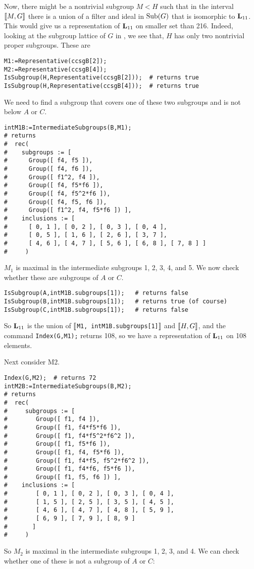 Now, there might be a nontrivial subgroup $M < H$ such that in the interval
$\llbracket M, G \rrbracket$ there is a union of a filter and ideal in $\operatorname{Sub}(G)$ that is isomorphic to
$\mathbf{L}_{11}$. This would give us a representation of $\mathbf{L}_{11}$ on smaller set than 216.
Indeed, looking at the subgroup lattice of $G$ in \xgap, we see that, 
$H$ has only two nontrivial proper subgroups.  These are

{\small 
\begin{verbatim}
M1:=Representative(ccsgB[2]);
M2:=Representative(ccsgB[4]);
IsSubgroup(H,Representative(ccsgB[2]));  # returns true
IsSubgroup(H,Representative(ccsgB[4]));  # returns true
\end{verbatim}
}
We need to find a subgroup that covers one of these two subgroups
and is not below $A$ or $C$.
{\small 
\begin{verbatim}
intM1B:=IntermediateSubgroups(B,M1);
# returns 
#  rec( 
#    subgroups := [ 
#      Group([ f4, f5 ]), 
#      Group([ f4, f6 ]), 
#      Group([ f1^2, f4 ]), 
#      Group([ f4, f5*f6 ]), 
#      Group([ f4, f5^2*f6 ]), 
#      Group([ f4, f5, f6 ]), 
#      Group([ f1^2, f4, f5*f6 ]) ], 
#    inclusions := [ 
#      [ 0, 1 ], [ 0, 2 ], [ 0, 3 ], [ 0, 4 ], 
#      [ 0, 5 ], [ 1, 6 ], [ 2, 6 ], [ 3, 7 ], 
#      [ 4, 6 ], [ 4, 7 ], [ 5, 6 ], [ 6, 8 ], [ 7, 8 ] ] 
#     )
\end{verbatim}
}
$M_1$ is maximal in the intermediate subgroups 1, 2, 3, 4, and 5.
We now check whether these are subgroups of $A$ or $C$.

{\small 
\begin{verbatim}
IsSubgroup(A,intM1B.subgroups[1]);   # returns false
IsSubgroup(B,intM1B.subgroups[1]);   # returns true (of course)
IsSubgroup(C,intM1B.subgroups[1]);   # returns false
\end{verbatim}
}
So $\mathbf{L}_{11}$ is the union of $\llbracket${\tt M1, intM1B.subgroups[1]}$\rrbracket$
and $\llbracket H, G \rrbracket$, and the command {\small{\tt Index(G,M1);}} returns 108,
so we have a representation of $\mathbf{L}_{11}$ on 108 elements.

Next consider M2.

{\small 
\begin{verbatim}
Index(G,M2);  # returns 72
intM2B:=IntermediateSubgroups(B,M2);
# returns 
#  rec( 
#     subgroups := [ 
#        Group([ f1, f4 ]), 
#        Group([ f1, f4*f5*f6 ]), 
#        Group([ f1, f4*f5^2*f6^2 ]), 
#        Group([ f1, f5*f6 ]), 
#        Group([ f1, f4, f5*f6 ]), 
#        Group([ f1, f4*f5, f5^2*f6^2 ]), 
#        Group([ f1, f4*f6, f5*f6 ]), 
#        Group([ f1, f5, f6 ]) ], 
#    inclusions := [ 
#        [ 0, 1 ], [ 0, 2 ], [ 0, 3 ], [ 0, 4 ], 
#        [ 1, 5 ], [ 2, 5 ], [ 3, 5 ], [ 4, 5 ], 
#        [ 4, 6 ], [ 4, 7 ], [ 4, 8 ], [ 5, 9 ], 
#        [ 6, 9 ], [ 7, 9 ], [ 8, 9 ] 
#       ] 
#     )
\end{verbatim}
}
So $M_2$ is maximal in the intermediate subgroups 1, 2, 3, and 4.
We can check whether one of these is not a subgroup of $A$ or $C$:

